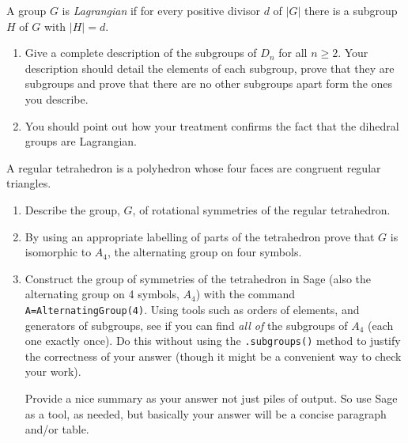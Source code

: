\documentclass[oneside,10pt]{amsart}
\begin{document}
\noindent
A group $G$ is \emph{Lagrangian} if for every positive divisor $d$ of $|G|$ there is a subgroup $H$ of $G$ with $|H| = d$.
\begin{enumerate}[label=(\alph*)]
\item
Give a complete description of the subgroups of $D_n$ for all $n \geq 2$. Your description should detail the elements of each subgroup, prove that they are subgroups and prove that there are no other subgroups apart form the ones you describe.
\item
You should point out how your treatment confirms the fact that the dihedral groups are Lagrangian.
\end{enumerate}
A regular tetrahedron is a polyhedron whose four faces are congruent regular triangles.
\begin{enumerate}[label=(\alph*)]
\item
Describe the group, $G$, of rotational symmetries of the regular tetrahedron.
\item
By using an appropriate labelling of parts of the tetrahedron prove that $G$ is isomorphic to $A_4$, the alternating group on four symbols.
\item
Construct the group of symmetries of the tetrahedron in Sage (also the alternating group on 4 symbols, \(A_4\)) with the command \texttt{A=AlternatingGroup(4)}.  Using tools such as orders of elements, and generators of subgroups, see if you can find \emph{all of} the subgroups of \(A_4\) (each one exactly once).  Do this without using the \texttt{.subgroups()} method to justify the correctness of your answer (though it might be a convenient way to check your work).%
\par
Provide a nice summary as your answer \textemdash{} not just piles of output.  So use Sage as a tool, as needed, but basically your answer will be a concise paragraph and/or table.
\end{enumerate}
\end{document}
